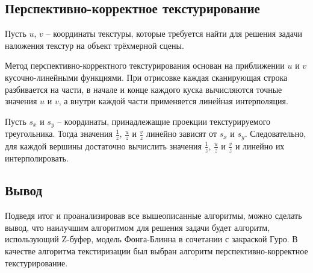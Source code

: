 \subsection{Перспективно-корректное текстурирование}

Пусть  $u$, $v$ -- координаты текстуры, которые требуется найти для решения задачи наложения текстур на объект трёхмерной сцены.

Метод перспективно-корректного текстурирования основан на приближении $u$ и $v$ кусочно-линейными функциями.
При отрисовке каждая сканирующая строка разбивается на части, в начале и конце каждого куска вычисляются точные значения
$u$ и $v$, а внутри каждой части применяется линейная интерполяция.

Пусть $s_x$ и $s_y$ -- координаты, принадлежащие проекции текстурируемого треугольника.
Тогда значения $ \frac{1}{z} $, $ \frac{u}{z} $ и $ \frac{v}{z} $ линейно зависят от $s_x$ и $s_y$.
Следовательно, для каждой вершины достаточно вычислить значения $ \frac{1}{z} $, $ \frac{u}{z} $ и $ \frac{v}{z} $ и линейно их интерполировать.

\subsection*{Вывод}
Подведя итог и проанализировав все вышеописанные алгоритмы, можно сделать вывод, что наилучшим алгоритмом для решения задачи будет алгоритм, использующий Z-буфер, модель Фонга-Блинна в сочетании с закраской Гуро. В качестве алгоритма текстиризации был выбран алгоритм перспективно-корректное текстурирование.